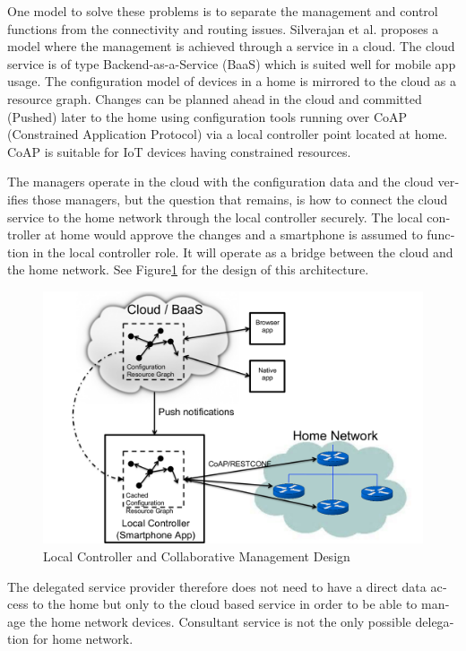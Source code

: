 \documentclass[12pt,a4paper,english]{tutthesis}
\begin{document}
\begin{otherlanguage}{english}
One model to solve these problems is to separate the management and
control functions from the connectivity and routing
issues. Silverajan et al. \cite{silverajan2015collaborative} proposes
a model where the management is achieved through a service in a cloud.
The cloud service is of type Backend-as-a-Service (BaaS) which is suited
well for mobile app usage. The
configuration model of devices in a home is mirrored to the cloud as a
resource graph.
Changes can be planned ahead in the cloud
and committed (Pushed) later to the home  using configuration 
tools 
running over CoAP (Constrained Application Protocol)
via a local controller point located at home.
CoAP is suitable for IoT devices having constrained resources.

The managers operate in the cloud with the configuration data and the
cloud verifies those managers,
but the question that remains, is how to connect the cloud service to the home network
through the local controller securely. The local controller at home
would approve the changes and a smartphone is assumed to function in
the local controller role. It will operate as a bridge between the cloud and the home network.
See Figure\ref{fig:localcontroller} for the design of this architecture.

\begin{figure}[htb]
\centering
\includegraphics[width=.9\linewidth]{localcontroller.png}
\caption{\label{fig:localcontroller}Local Controller and Collaborative Management Design}
\end{figure}



The delegated service provider therefore does not need to have a direct data
access to the home but only to the cloud based service in order to be able to
manage the home network devices.
Consultant service is not the only possible delegation for home network.









\end{otherlanguage}
\end{document}
